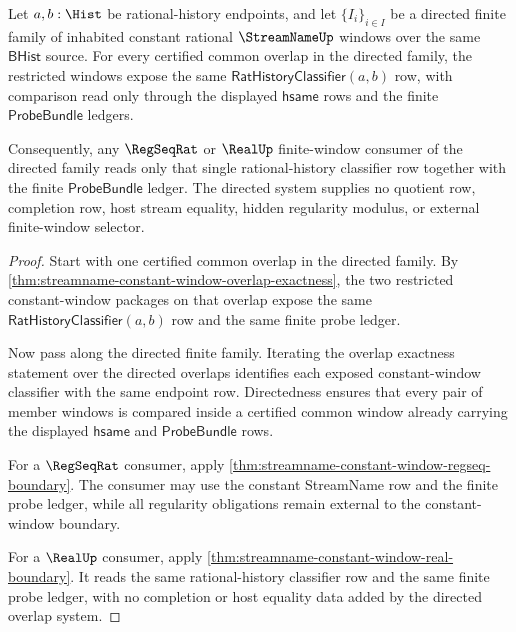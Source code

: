 \begin{theorem}
\label{thm:streamname-constant-window-directed-overlap-exactness}
Let $a,b:\Hist$ be rational-history endpoints, and let
$\{I_i\}_{i\in I}$ be a directed finite family of inhabited constant rational
$\StreamNameUp$ windows over the same $\mathsf{BHist}$ source. For every
certified common overlap in the directed family, the restricted windows expose
the same $\mathsf{RatHistoryClassifier}(a,b)$ row, with comparison read only
through the displayed $\mathsf{hsame}$ rows and the finite
$\mathsf{ProbeBundle}$ ledgers.

Consequently, any $\RegSeqRat$ or $\RealUp$ finite-window consumer of the
directed family reads only that single rational-history classifier row together
with the finite $\mathsf{ProbeBundle}$ ledger. The directed system supplies no
quotient row, completion row, host stream equality, hidden regularity modulus,
or external finite-window selector.
\end{theorem}
\begin{proof}
Start with one certified common overlap in the directed family. By
\autoref{thm:streamname-constant-window-overlap-exactness}, the two restricted
constant-window packages on that overlap expose the same
$\mathsf{RatHistoryClassifier}(a,b)$ row and the same finite probe ledger.

Now pass along the directed finite family. Iterating the overlap exactness
statement over the directed overlaps identifies each exposed constant-window
classifier with the same endpoint row. Directedness ensures that every pair of
member windows is compared inside a certified common window already carrying
the displayed $\mathsf{hsame}$ and $\mathsf{ProbeBundle}$ rows.

For a $\RegSeqRat$ consumer, apply
\autoref{thm:streamname-constant-window-regseq-boundary}. The consumer may use
the constant StreamName row and the finite probe ledger, while all regularity
obligations remain external to the constant-window boundary.

For a $\RealUp$ consumer, apply
\autoref{thm:streamname-constant-window-real-boundary}. It reads the same
rational-history classifier row and the same finite probe ledger, with no
completion or host equality data added by the directed overlap system.
\end{proof}

